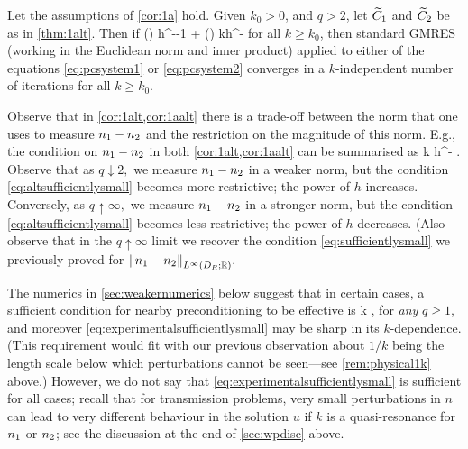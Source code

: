 \label{cor:1aalt}
Let the assumptions of \cref{cor:1a} hold.  Given $k_0>0$, and $q >2$, let $\widetilde{C}_{1}$ and $\widetilde{C}_{2}$ be as in \cref{thm:1alt}. Then if 
\beq\label{eq:condaalt}
\Cotilde \mleft(\frac{\splus}{\mminus}\mright) h^{--1} \NLqDRRRdtd{\Aso-\Ast} + \Cttilde \mleft(\frac{\mplus}{\mminus}\mright) kh^{-} \NLqDRRR{\nso-\nst} \leq \half
\eeq
for all $k\geq k_0$, then standard GMRES (working in the Euclidean norm and inner product) applied to either of the equations \cref{eq:pcsystem1} or \cref{eq:pcsystem2}
 converges in a $k$-independent number of iterations for all $k\geq k_0$.
\enth

Observe that in \cref{cor:1alt,cor:1aalt} there is a trade-off between the norm that one uses to measure $n_{1}-n_{2}$ and the restriction on the magnitude of this norm. E.g., the condition on $n_{1}-n_{2}$ in both \cref{cor:1alt,cor:1aalt} can be summarised as
\beq\label{eq:altsufficientlysmall}
\NLqDRRR{\no-\nt} k h^{-} .
\eeq
Observe that as $q \downarrow 2,$ we measure $n_{1}-n_{2}$ in a weaker norm, but the condition \cref{eq:altsufficientlysmall} becomes more restrictive; the power of $h$ increases. Conversely, as $q \uparrow \infty,$ we measure $n_{1}-n_{2}$ in a stronger norm, but the condition \cref{eq:altsufficientlysmall} becomes less restrictive; the power of $h$ decreases. (Also observe that in the $q\uparrow\infty$ limit we recover the condition \cref{eq:sufficientlysmall} we previously proved for $\NLiDRRR{\no-\nt}.$
\ere

The numerics in \cref{sec:weakernumerics} below suggest that in certain cases, a sufficient condition for nearby preconditioning to be effective is
\beq\label{eq:experimentalsufficientlysmall}
\NLqDRRR{\no-\nt} k \quad{},
\eeq
for \emph{any} $q \geq 1$, and moreover \cref{eq:experimentalsufficientlysmall} may be sharp in its $k$-dependence. (This requirement would fit with our previous observation about $1/k$ being the length scale below which perturbations cannot be seen---see \cref{rem:physical1k} above.) However, we do not say that \cref{eq:experimentalsufficientlysmall} is sufficient for all cases; recall that for transmission problems, very small perturbations in $n$ can lead to very different behaviour in the solution $u$ if $k$ is a quasi-resonance for $n_{1}$ or $n_{2}$; see the discussion at the end of \cref{sec:wpdisc} above.


